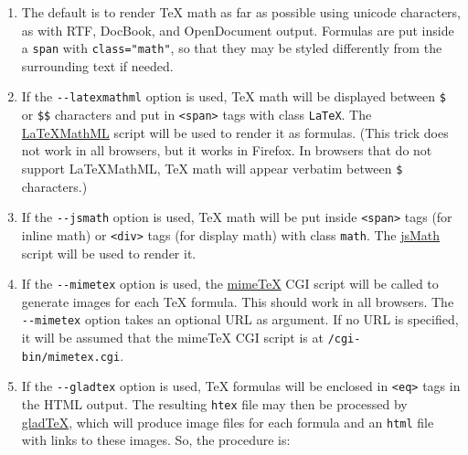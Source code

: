 \documentclass[]{article}
\begin{document}
\begin{description}
\begin{enumerate}[1.]
\item
  The default is to render TeX math as far as possible using unicode
  characters, as with RTF, DocBook, and OpenDocument output. Formulas
  are put inside a \texttt{span} with \texttt{class="math"}, so that
  they may be styled differently from the surrounding text if needed.
\item
  If the \texttt{-{}-latexmathml} option is used, TeX math will be
  displayed between \texttt{\$} or \texttt{\$\$} characters and put in
  \texttt{\textless{}span\textgreater{}} tags with class \texttt{LaTeX}.
  The \href{http://math.etsu.edu/LaTeXMathML/}{LaTeXMathML} script will
  be used to render it as formulas. (This trick does not work in all
  browsers, but it works in Firefox. In browsers that do not support
  LaTeXMathML, TeX math will appear verbatim between \texttt{\$}
  characters.)
\item
  If the \texttt{-{}-jsmath} option is used, TeX math will be put inside
  \texttt{\textless{}span\textgreater{}} tags (for inline math) or
  \texttt{\textless{}div\textgreater{}} tags (for display math) with
  class \texttt{math}. The
  \href{http://www.math.union.edu/~dpvc/jsmath/}{jsMath} script will be
  used to render it.
\item
  If the \texttt{-{}-mimetex} option is used, the
  \href{http://www.forkosh.com/mimetex.html}{mimeTeX} CGI script will be
  called to generate images for each TeX formula. This should work in
  all browsers. The \texttt{-{}-mimetex} option takes an optional URL as
  argument. If no URL is specified, it will be assumed that the mimeTeX
  CGI script is at \texttt{/cgi-bin/mimetex.cgi}.
\item
  If the \texttt{-{}-gladtex} option is used, TeX formulas will be
  enclosed in \texttt{\textless{}eq\textgreater{}} tags in the HTML
  output. The resulting \texttt{htex} file may then be processed by
  \href{http://ans.hsh.no/home/mgg/gladtex/}{gladTeX}, which will
  produce image files for each formula and an \texttt{html} file with
  links to these images. So, the procedure is:


\end{enumerate}
\end{description}
\end{document}
